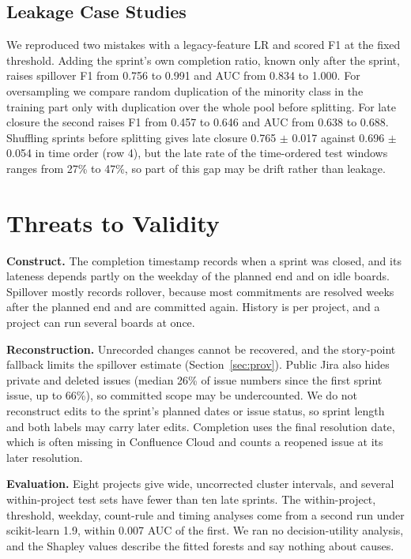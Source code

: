 \documentclass[conference]{IEEEtran}
\begin{document}
\subsection{Leakage Case Studies}
\label{sec:leak}

We reproduced two mistakes with a legacy-feature LR and scored F1 at the fixed threshold. Adding the sprint's own completion ratio, known only after the sprint, raises spillover F1 from 0.756 to 0.991 and AUC from 0.834 to 1.000. For oversampling we compare random duplication of the minority class in the training part only with duplication over the whole pool before splitting. For late closure the second raises F1 from 0.457 to 0.646 and AUC from 0.638 to 0.688. Shuffling sprints before splitting gives late closure 0.765 $\pm$ 0.017 against 0.696 $\pm$ 0.054 in time order (row 4), but the late rate of the time-ordered test windows ranges from 27\% to 47\%, so part of this gap may be drift rather than leakage.

\section{Threats to Validity}

\textbf{Construct.} The completion timestamp records when a sprint was closed, and its lateness depends partly on the weekday of the planned end and on idle boards. Spillover mostly records rollover, because most commitments are resolved weeks after the planned end and are committed again. History is per project, and a project can run several boards at once.

\textbf{Reconstruction.} Unrecorded changes cannot be recovered, and the story-point fallback limits the spillover estimate (Section~\ref{sec:prov}). Public Jira also hides private and deleted issues (median 26\% of issue numbers since the first sprint issue, up to 66\%), so committed scope may be undercounted. We do not reconstruct edits to the sprint's planned dates or issue status, so sprint length and both labels may carry later edits. Completion uses the final resolution date, which is often missing in Confluence Cloud and counts a reopened issue at its later resolution.

\textbf{Evaluation.} Eight projects give wide, uncorrected cluster intervals, and several within-project test sets have fewer than ten late sprints. The within-project, threshold, weekday, count-rule and timing analyses come from a second run under scikit-learn 1.9, within 0.007 AUC of the first. We ran no decision-utility analysis, and the Shapley values describe the fitted forests and say nothing about causes.
\end{document}
